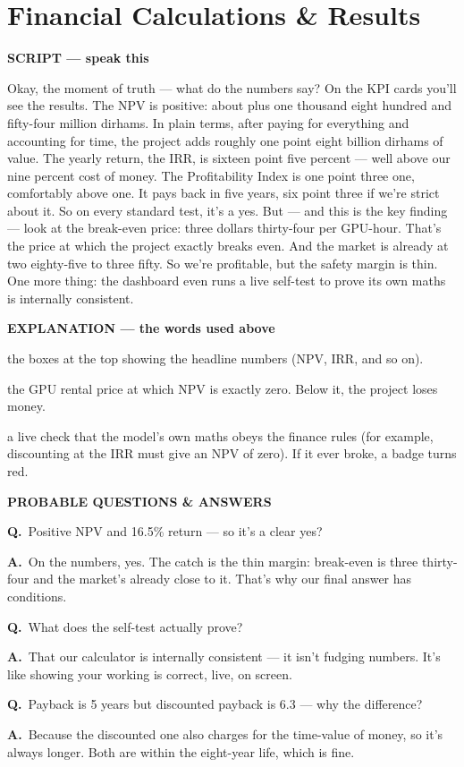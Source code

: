 \documentclass[12pt,a4paper]{article}
\newcommand{\block}[2]{\par\medskip\noindent\textcolor{#1}{\textbf{#2}}\par\nobreak\smallskip}
\newcommand{\SC}{\block{tvblue}{SCRIPT --- speak this}}
\newcommand{\EX}{\block{tvgreen}{EXPLANATION --- the words used above}}
\newcommand{\PQ}{\block{tvamber}{PROBABLE QUESTIONS \& ANSWERS}}
\newcommand{\qa}[2]{\par\noindent\textbf{Q.}~#1\par\noindent\textbf{A.}~#2\par\smallskip}
\newenvironment{terms}{\begin{description}[leftmargin=0pt,itemsep=2pt,font=\normalfont\bfseries]}{\end{description}}
\begin{document}
\section{Financial Calculations \& Results}

\SC
Okay, the moment of truth --- what do the numbers say? On the KPI cards you'll see the results. The
NPV is positive: about plus one thousand eight hundred and fifty-four million dirhams. In plain terms,
after paying for everything and accounting for time, the project adds roughly one point eight billion
dirhams of value. The yearly return, the IRR, is sixteen point five percent --- well above our nine
percent cost of money. The Profitability Index is one point three one, comfortably above one. It pays
back in five years, six point three if we're strict about it. So on every standard test, it's a yes.
But --- and this is the key finding --- look at the break-even price: three dollars thirty-four per
GPU-hour. That's the price at which the project exactly breaks even. And the market is already at two
eighty-five to three fifty. So we're profitable, but the safety margin is thin. One more thing: the
dashboard even runs a live self-test to prove its own maths is internally consistent.

\EX
\begin{terms}
  \item[KPI cards:] the boxes at the top showing the headline numbers (NPV, IRR, and so on).
  \item[Break-even price (\$3.34):] the GPU rental price at which NPV is exactly zero. Below it, the
  project loses money.
  \item[Self-test:] a live check that the model's own maths obeys the finance rules (for example,
  discounting at the IRR must give an NPV of zero). If it ever broke, a badge turns red.
\end{terms}

\PQ
\qa{Positive NPV and 16.5\% return --- so it's a clear yes?}{On the numbers, yes. The catch is the thin
margin: break-even is three thirty-four and the market's already close to it. That's why our final
answer has conditions.}
\qa{What does the self-test actually prove?}{That our calculator is internally consistent --- it isn't
fudging numbers. It's like showing your working is correct, live, on screen.}
\qa{Payback is 5 years but discounted payback is 6.3 --- why the difference?}{Because the discounted
one also charges for the time-value of money, so it's always longer. Both are within the eight-year
life, which is fine.}
\end{document}
